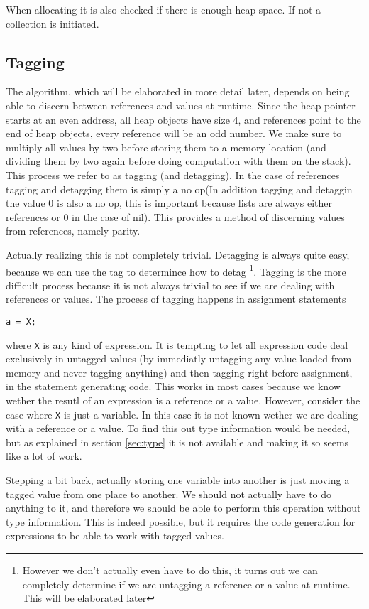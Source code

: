 \documentclass{scrartcl}
\begin{document}
When allocating it is also checked if there is enough heap space.
If not a collection is initiated.

\subsection{Tagging}

The algorithm, which will be elaborated in more detail later, 
 depends on being able to discern between references and
values at runtime. Since the heap pointer starts at an even address, 
all heap objects have size 4, and references point to the end of heap
objects, every reference will be an odd number. We make sure to multiply
all values by two before storing them to a memory location (and 
dividing them by two again before doing computation with them on the
stack). This process we refer to as tagging (and detagging). In the
case of references tagging and detagging them is simply a no op(In
addition tagging and detaggin the value 0 is also a no op, this is 
important because lists are always either references or 0 in the case
of nil).
This provides a method of discerning values from references, namely
parity. 

Actually realizing this is not completely trivial. Detagging is always
quite easy, because we can use the tag to determince how to detag
\footnote{However we don't actually even have to do this, it turns
out we can completely determine if we are untagging a reference or a 
value at runtime. This will be elaborated later}. Tagging is the more
difficult process because it is not always trivial to see if we are
dealing with references or values. The process of
tagging happens in assignment statements
\begin{lstlisting}
a = X;
\end{lstlisting}
where \lstinline{X} is any kind of expression. It is tempting to 
let all expression code deal exclusively in untagged values (by 
immediatly untagging any value loaded from memory and never tagging
anything) and then
tagging right before assignment, in the statement generating code.
This works in most cases because we know wether the resutl of an 
expression is a reference or a value. However, consider the case where
\lstinline{X} is just a variable. In this case it is not known wether
we are dealing with a reference or a value. To find this out type
information would be needed, but as explained in section \ref{sec:type}
it is not available and making it so seems like a lot of work.

Stepping a bit back, actually storing one variable into another is just
moving a tagged value from one place to another. We should not actually
have to do anything to it, and therefore we should be able to perform
this operation without type information. This is indeed possible, but
it requires the code generation for expressions to be able to work 
with tagged values.
\end{document}
